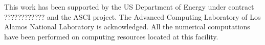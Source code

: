 \documentclass[prl,aps,letterpaper,twocolumn,showpacs,twocolumngrid,superbib]{revtex4}
\begin{document}
\begin{acknowledgments}
 This work has been supported by the US Department of Energy 
 under contract ???????????? and the ASCI project.  
 The Advanced Computing Laboratory of Los 
 Alamos National Laboratory is acknowledged.
 All the numerical computations have been
 performed on computing resources located at this facility.
\end{acknowledgments}



\end{document}
